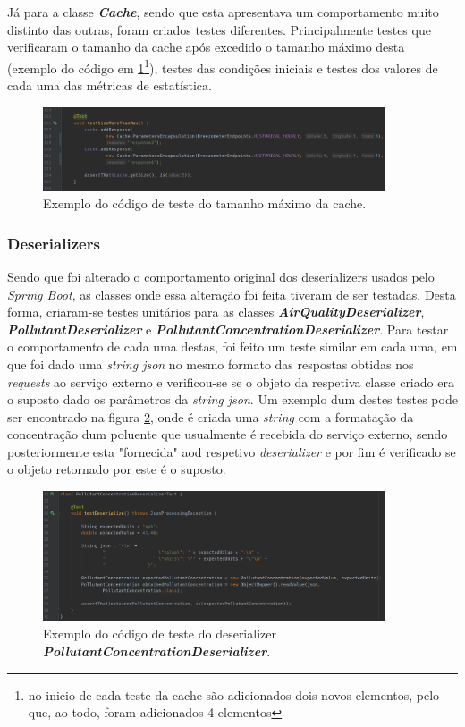 Já para a classe \textbf{\textit{Cache}}, sendo que esta apresentava um comportamento muito distinto das outras, foram criados testes diferentes. Principalmente testes que verificaram o tamanho da cache após excedido o tamanho máximo desta (exemplo do código em \ref{fig:cache_max}\footnote{no inicio de cada teste da cache são adicionados dois novos elementos, pelo que, ao todo, foram adicionados 4 elementos}), testes das condições iniciais e testes dos valores de cada uma das métricas de estatística.

\begin{figure}[h]
   \centering
   \includegraphics[width=0.90\textwidth]{images/cache_max}
   \caption{Exemplo do código de teste do tamanho máximo da cache.}
   \label{fig:cache_max}
\end{figure}


\subsubsection{Deserializers}
Sendo que foi alterado o comportamento original dos deserializers usados pelo \textit{Spring Boot}, as classes onde essa alteração foi feita tiveram de ser testadas. Desta forma, criaram-se testes unitários para as classes \textbf{\textit{AirQualityDeserializer}}, \textbf{\textit{PollutantDeserializer}} e \textbf{\textit{PollutantConcentrationDeserializer}}. 
Para testar o comportamento de cada uma destas, foi feito um teste similar em cada uma, em que foi dado uma \textit{string json} no mesmo formato das respostas obtidas nos \textit{requests} ao serviço externo e verificou-se se o objeto da respetiva classe criado era o suposto dado os parâmetros da \textit{string json}. 
Um exemplo dum destes testes pode ser encontrado na figura \ref{fig:serializer_test}, onde é criada uma \textit{string} com a formatação da concentração dum poluente que usualmente é recebida do serviço externo, sendo posteriormente esta "fornecida" aod respetivo \textit{deserializer} e por fim é verificado se o objeto retornado por este é o suposto.

\begin{figure}[h]
   \centering
   \includegraphics[width=0.90\textwidth]{images/serializer_test}
   \caption{Exemplo do código de teste do deserializer \textbf{\textit{PollutantConcentrationDeserializer}}.}
   \label{fig:serializer_test}
\end{figure}
